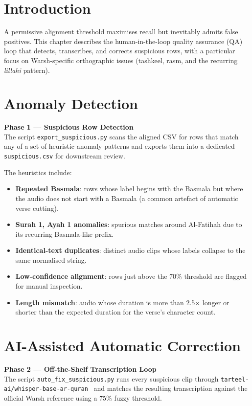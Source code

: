 \documentclass[12pt,a4paper]{report}
\newcommand{\phaseblock}[3]{%
  \begin{tcolorbox}[
    enhanced, colback=white, colframe=black,
    leftrule=5pt, sharp corners, before upper={\parindent0pt}
  ]
  {\bfseries\color{black}Phase #1 --- #2}\\[4pt]
  \small #3
  \end{tcolorbox}%
}
\begin{document}
\section{Introduction}
A permissive alignment threshold maximises recall but inevitably admits
false positives. This chapter describes the human-in-the-loop quality
assurance (QA) loop that detects, transcribes, and corrects suspicious
rows, with a particular focus on Warsh-specific orthographic issues
(tashkeel, rasm, and the recurring \emph{lillahi} pattern).

\section{Anomaly Detection}

\phaseblock{1}{Suspicious Row Detection}{The script
\texttt{export\_suspicious.py} scans the aligned CSV for rows that match
any of a set of heuristic anomaly patterns and exports them into a
dedicated \texttt{suspicious.csv} for downstream review.}

The heuristics include:
\begin{itemize}
  \item \textbf{Repeated Basmala}: rows whose label begins with the
        Basmala but where the audio does not start with a Basmala (a
        common artefact of automatic verse cutting).
  \item \textbf{Surah 1, Ayah 1 anomalies}: spurious matches around
        Al-Fatihah due to its recurring Basmala-like prefix.
  \item \textbf{Identical-text duplicates}: distinct audio clips whose
        labels collapse to the same normalised string.
  \item \textbf{Low-confidence alignment}: rows just above the 70\%
        threshold are flagged for manual inspection.
  \item \textbf{Length mismatch}: audio whose duration is more than
        2.5$\times$ longer or shorter than the expected duration for the
        verse's character count.
\end{itemize}

\section{AI-Assisted Automatic Correction}

\phaseblock{2}{Off-the-Shelf Transcription Loop}{The script
\texttt{auto\_fix\_suspicious.py} runs every suspicious clip through
\texttt{tarteel-ai/whisper-base-ar-quran}~\cite{tarteelmodel} and matches
the resulting transcription against the official Warsh reference using a
75\% fuzzy threshold.}
\end{document}

